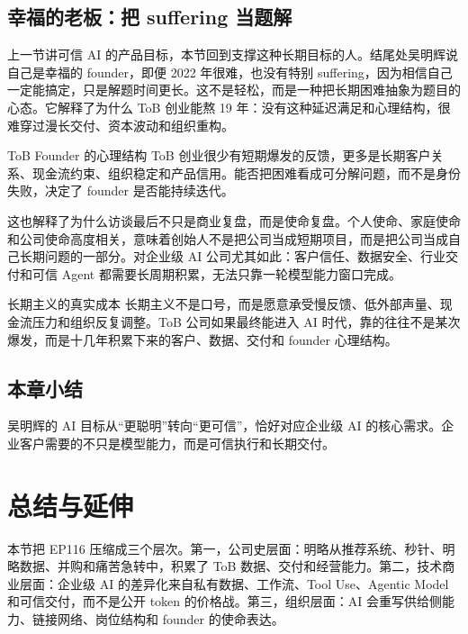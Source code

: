 \documentclass[a4paper]{article}
\begin{document}
\subsection{幸福的老板：把 suffering 当题解}

上一节讲可信 AI 的产品目标，本节回到支撑这种长期目标的人。结尾处吴明辉说自己是幸福的 founder，即便 2022 年很难，也没有特别 suffering，因为相信自己一定能搞定，只是解题时间更长。这不是轻松，而是一种把长期困难抽象为题目的心态。它解释了为什么 ToB 创业能熬 19 年：没有这种延迟满足和心理结构，很难穿过漫长交付、资本波动和组织重构。

\begin{knowledgebox}{ToB Founder 的心理结构}
ToB 创业很少有短期爆发的反馈，更多是长期客户关系、现金流约束、组织稳定和产品信用。能否把困难看成可分解问题，而不是身份失败，决定了 founder 是否能持续迭代。
\end{knowledgebox}

这也解释了为什么访谈最后不只是商业复盘，而是使命复盘。个人使命、家庭使命和公司使命高度相关，意味着创始人不是把公司当成短期项目，而是把公司当成自己长期问题的一部分。对企业级 AI 公司尤其如此：客户信任、数据安全、行业交付和可信 Agent 都需要长周期积累，无法只靠一轮模型能力窗口完成。

\begin{importantbox}{长期主义的真实成本}
长期主义不是口号，而是愿意承受慢反馈、低外部声量、现金流压力和组织反复调整。ToB 公司如果最终能进入 AI 时代，靠的往往不是某次爆发，而是十几年积累下来的客户、数据、交付和 founder 心理结构。
\end{importantbox}

\subsection{本章小结}

吴明辉的 AI 目标从“更聪明”转向“更可信”，恰好对应企业级 AI 的核心需求。企业客户需要的不只是模型能力，而是可信执行和长期交付。

\section{总结与延伸}

本节把 EP116 压缩成三个层次。第一，公司史层面：明略从推荐系统、秒针、明略数据、并购和痛苦急转中，积累了 ToB 数据、交付和经营能力。第二，技术商业层面：企业级 AI 的差异化来自私有数据、工作流、Tool Use、Agentic Model 和可信交付，而不是公开 token 的价格战。第三，组织层面：AI 会重写供给侧能力、链接网络、岗位结构和 founder 的使命表达。
\end{document}
